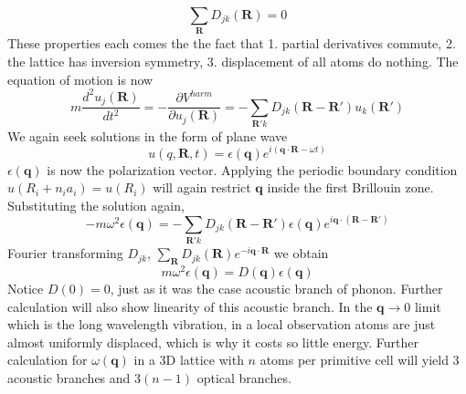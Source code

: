 \documentclass{article}
\begin{document}
$$\sum_{\mathbf{R}}D_{jk}(\mathbf{R})=0$$
These properties each comes the the fact that 1. partial derivatives commute, 2. the lattice has inversion symmetry, 3. displacement of all atoms do nothing. The equation of motion is now
$$m\frac{d^2u_j(\mathbf{R})}{dt^2}=-\frac{\partial V^{harm}}{\partial u_j(\mathbf{R})}=-\sum_{\mathbf{R}'k}D_{jk}(\mathbf{R}-\mathbf{R}')u_k(\mathbf{R}')$$
We again seek solutions in the form of plane wave
$$u(q,\mathbf{R},t)=\epsilon(\mathbf{q})e^{i(\mathbf{q}\cdot \mathbf{R}-\omega t)}$$
$\epsilon(\mathbf{q})$ is now the polarization vector. Applying the periodic boundary condition $u(R_i+n_ia_i)=u(R_i)$ will again restrict $\mathbf{q}$ inside the first Brillouin zone. Substituting the solution again,
$$-m\omega^2\epsilon(\mathbf{q})=-\sum_{\mathbf{R'}k}D_{jk}(\mathbf{R}-\mathbf{R'})\epsilon(\mathbf{q})e^{i\mathbf{q}\cdot(\mathbf{R}-\mathbf{R'})}$$
Fourier transforming $D_{jk}$, $\sum_\mathbf{R}D_{jk}(\mathbf{R})e^{-i\mathbf{q}\cdot\mathbf{R}}$ we obtain
$$m\omega^2\epsilon(\mathbf{q})=D(\mathbf{q})\epsilon(\mathbf{q})$$
Notice $D(0)=0$, just as it was the case acoustic branch of phonon. Further calculation will also show linearity of this acoustic branch. In the $\mathbf{q}\to0$ limit which is the long wavelength vibration, in a local observation atoms are just almost uniformly displaced, which is why it costs so little energy. Further calculation for $\omega(\mathbf{q})$ in a 3D lattice with $n$ atoms per primitive cell will yield 3 acoustic branches and $3(n-1)$ optical branches.
\end{document}
